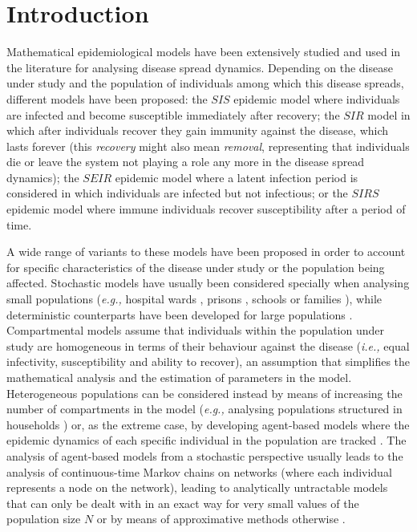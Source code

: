 \documentclass[preprint,12pt]{elsarticle}
\begin{document}
\section{Introduction}
\label{Sect1}

\par Mathematical epidemiological models have been extensively studied and used in the literature for analysing disease spread dynamics. Depending on the disease under study and the population of
individuals among which this disease spreads, different models have been proposed: the $SIS$ epidemic model where individuals are infected and become susceptible immediately after recovery; the $SIR$ model in which after individuals recover they gain immunity against the disease, which lasts forever (this {\it recovery} might also mean {\it removal}, representing that individuals die or leave the system not playing a role any more in the disease spread dynamics); the $SEIR$ epidemic model where a latent infection period is considered in which individuals are infected but not infectious; or the $SIRS$ epidemic model where immune individuals recover susceptibility after a period of time.

\par A wide range of variants to these models have been proposed in order to account for specific characteristics of the disease under study or the population being affected. Stochastic models
have usually been considered specially when analysing small populations ({\it e.g.,} hospital wards \cite{artalejo2011sis,lopez2016stochastic}, prisons \cite{hotta2010bayesian}, schools \cite{artalejo2010number,stone2008stochastic} or families \cite{economou2015stochastic}), while deterministic counterparts have been developed for large populations \cite{allen2000comparison}. Compartmental models assume that individuals within the population under study are homogeneous in terms of their behaviour against the disease ({\it i.e.,} equal infectivity, susceptibility and ability to recover), an assumption that simplifies the mathematical analysis and the estimation of parameters in the model. Heterogeneous populations can be considered instead by means of increasing the number of compartments in the model ({\it e.g.,} analysing populations structured in households \cite{ball2016reproduction,pellis2012reproduction}) or, as the extreme case, by developing agent-based models where the epidemic dynamics of each specific individual in the population are tracked \cite{graw2012agent}. The analysis of agent-based models from a stochastic perspective usually leads to the analysis of continuous-time Markov chains on networks \cite{economou2015stochastic,lopez2016stochastic} (where each individual represents a node on the network), leading to analytically untractable models that can only be dealt with in an exact way for very small values of the population size $N$ \cite{economou2015stochastic,lopez2016stochastic} or by means of approximative methods otherwise \cite{li2012susceptible,pastor2001epidemic,youssef2011individual}.
\end{document}
